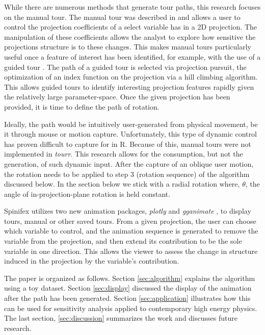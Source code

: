 \documentclass{monashthesis}
\begin{document}
While there are numerous methods that generate tour paths, this research focuses on the manual tour. The manual tour was described in \textcite{cook_manual_1997} and allows a user to control the projection coefficients of a select variable has in a 2D projection. The manipulation of these coefficients allows the analyst to explore how sensitive the projections structure is to these changes. This makes manual tours particularly useful once a feature of interest has been identified, for example, with the use of a guided tour \autocite{cook_grand_1995}. The path of a guided tour is selected via projection pursuit, the optimization of an index function on the projection via a hill climbing algorithm. This allows guided tours to identify interesting projection features rapidly given the relatively large parameter-space. Once the given projection has been provided, it is time to define the path of rotation.

Ideally, the path would be intuitively user-generated from physical movement, be it through mouse or motion capture. Unfortunately, this type of dynamic control has proven difficult to capture for in R. Because of this, manual tours were not implemented in \emph{tourr}. This research allows for the consumption, but not the generation, of such dynamic input. After the capture of an oblique user motion, the rotation needs to be applied to step 3 (rotation sequence) of the algorithm discussed below. In the section below we stick with a radial rotation where, \(\theta\), the angle of in-projection-plane rotation is held constant.

Spinifex utilizes two new animation packages, \emph{plotly} \autocite{sievert_plotly_2018} and \emph{gganimate} \autocite{pedersen_gganimate:_2019}, to display tours, manual or other saved tours. From a given projection, the user can choose which variable to control, and the animation sequence is generated to remove the variable from the projection, and then extend its contribution to be the sole variable in one direction. This allows the viewer to assess the change in structure induced in the projection by the variable's contribution.

The paper is organized as follows. Section \ref{sec:algorithm} explains the algorithm using a toy dataset. Section \ref{sec:display} discussed the display of the animation after the path has been generated. Section \ref{sec:application} illustrates how this can be used for sensitivity analysis applied to contemporary high energy physics. The last section, \ref{sec:discussion} summarizes the work and discusses future research.
\end{document}
